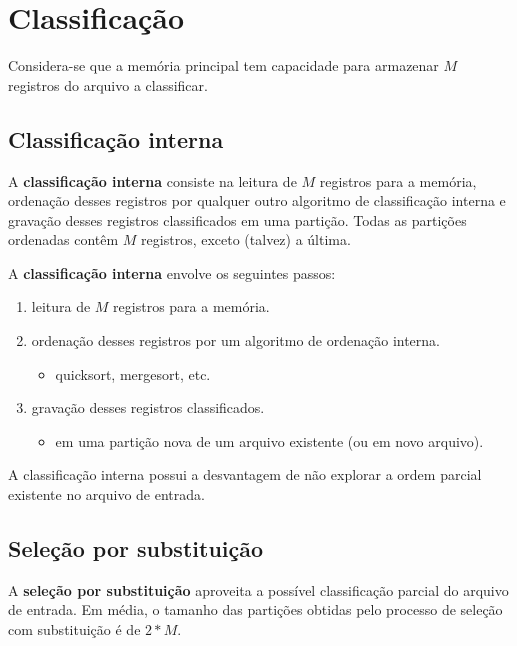 \section{Classificação}

Considera-se que a memória principal tem capacidade para armazenar
$M$ registros do arquivo a classificar.

\subsection{Classificação interna}

A {\bf classificação interna} consiste na leitura de $M$  registros
para a memória, ordenação desses registros por qualquer outro algoritmo
de classificação interna e gravação desses registros classificados
em uma partição. 
Todas as partições ordenadas contêm $M$ registros, exceto (talvez) a última.

A {\bf classificação interna} envolve os seguintes passos:
\begin{enumerate}
\item leitura de $M$ registros para a memória.
\item ordenação desses registros por um algoritmo de ordenação interna.
	\begin{itemize}
	\item quicksort, mergesort, etc.
	\end{itemize}
\item gravação desses registros classificados.
	\begin{itemize}
	\item em uma partição nova de um arquivo existente (ou em novo arquivo).
	\end{itemize}
\end{enumerate}

A classificação interna possui a desvantagem de não explorar a ordem
parcial existente no arquivo de entrada.

\subsection{Seleção por substituição}

A {\bf seleção por substituição}  aproveita a possível classificação
parcial do arquivo de entrada. 
Em média, o tamanho das partições obtidas pelo processo de seleção com substituição
é de $2 * M$.

